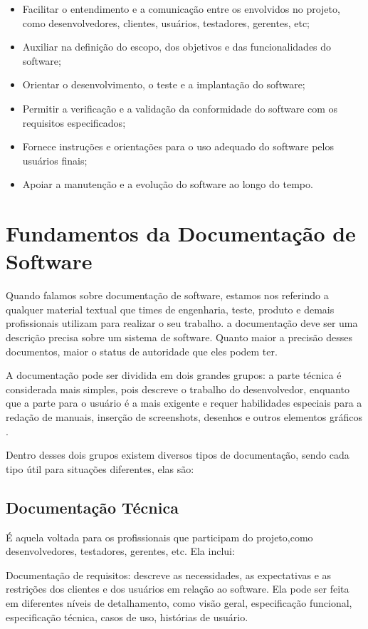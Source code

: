 \documentclass[12pt,oneside,a4paper,article]{abntex2}
\begin{document}
\begin{itemize}
      \item Facilitar o entendimento e a comunicação entre os envolvidos no projeto, como desenvolvedores,
            clientes, usuários, testadores, gerentes, etc;
      \item Auxiliar na definição do escopo, dos objetivos e das funcionalidades do software;
      \item Orientar o desenvolvimento, o teste e a implantação do software;
      \item Permitir a verificação e a validação da conformidade do software com os requisitos especificados;
      \item Fornece instruções e orientações para o uso adequado do software pelos usuários finais;
      \item Apoiar a manutenção e a evolução do software ao longo do tempo.
\end{itemize}

\section{Fundamentos da Documentação de Software}
Quando falamos sobre documentação de software, estamos nos referindo a qualquer material textual que times de engenharia, teste, produto e demais profissionais utilizam para realizar o seu trabalho. a documentação deve ser uma descrição precisa sobre um sistema de software. Quanto maior a precisão desses documentos, maior o status de autoridade que eles podem ter.

A documentação pode ser dividida em dois grandes grupos: a parte técnica é considerada mais simples, pois descreve o trabalho do desenvolvedor, enquanto
que a parte para o usuário é a mais exigente e requer habilidades especiais para a redação de manuais, inserção de screenshots, desenhos e outros elementos
gráficos \cite{coelho2009documentaccao}.

Dentro desses dois grupos existem diversos tipos de documentação, sendo cada tipo útil para situações diferentes, elas são:

\subsection{Documentação Técnica}
É aquela voltada para os profissionais que participam do projeto,como desenvolvedores, testadores, gerentes, etc. Ela inclui:

Documentação de requisitos: descreve as necessidades, as expectativas e as restrições dos clientes e dos usuários em relação ao software. Ela pode ser feita em diferentes níveis de detalhamento,
como visão geral, especificação funcional, especificação técnica, casos de uso, histórias de usuário.
\end{document}
